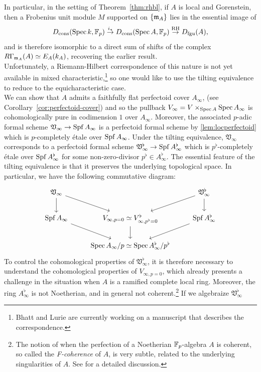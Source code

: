 In particular, in the setting of Theorem~\ref{thm:rhbl}, if $A$ is local and Gorenstein, then a Frobenius unit module $M$ supported on 
$\{\mathfrak{m}_A\}$ lies in the essential image of 
\[D_{\mathrm{cons}}(\operatorname{Spec}{k}, \mathbb{F}_p) \stackrel{i_*}{\rightarrow} D_{\mathrm{cons}}(\operatorname{Spec}{A}, \mathbb{F}_p) \stackrel{\mathrm{RH}}{\rightarrow} D_{\mathrm{fgu}}(A),\]
and is therefore isomorphic to a direct sum of shifts of the complex $R\Gamma_{\mathfrak{m}_A}(A) \simeq E_A(k_A)$, recovering the earlier result.\\
\indent Unfortunately, a Riemann-Hilbert correspondence of this nature is not yet available in mixed characteristic,\footnote{Bhatt and Lurie are currently working on a manuscript that
describes the correspondence.} so one would like to use the tilting equivalence to reduce to the equicharacteristic case.\\
\indent We can show that $A$ admits a faithfully flat perfectoid cover $A_{\infty}$, (see Corollary~\ref{cor:perfectoid-cover}) and so the pullback 
$V_{\infty} = V \times_{\operatorname{Spec}{A}} \operatorname{Spec}{A_{\infty}}$ is cohomologically pure in codimension $1$ over $A_{\infty}$.
Moreover, the associated $p$-adic formal scheme $\mathfrak{V}_{\infty} \rightarrow \operatorname{Spf}{A_{\infty}}$ is a perfectoid formal scheme by \ref{lem:locperfectoid}
which is $p$-completely \'{e}tale over $\operatorname{Spf}{A_{\infty}}$.
Under the tilting equivalence, $\mathfrak{V}_{\infty}$ corresponds to a perfectoid formal scheme $\mathfrak{V}_{\infty}^{\flat} \rightarrow \operatorname{Spf}{A_{\infty}^{\flat}}$ which is 
$p^{\flat}$-completely \'{e}tale over $\operatorname{Spf}{A_{\infty}^{\flat}}$ for some non-zero-divisor $p^{\flat} \in A_{\infty}^{\flat}$. 
The essential feature of the tilting equivalence is that it preserves the underlying topological space. In particular, we have the following commutative diagram:
\[\begin{tikzcd}\mathfrak{V}_{\infty} \arrow[d] \arrow[rd] & & \mathfrak{V}_{\infty}^{\flat} \arrow[d] \arrow[ld]\\
    \spf{A_{\infty}} \arrow[rd] & V_{\infty,p=0}\simeq V^{\flat}_{\infty, p^{\flat}=0} \arrow[d] & \spf{A_{\infty}^{\flat}} \arrow[ld]\\
    & \spec{A_{\infty}/p} \simeq \spec{A_{\infty}^{\flat}/p^{\flat}}
\end{tikzcd}\]
To control the cohomological properties of $\mathfrak{V}_{\infty}^{\flat}$, it is therefore necessary to understand
the cohomological properties of $V_{\infty,p=0}$, which already presents a challenge in the situation when $A$ is a ramified complete local ring.
Moreover, the ring $A_{\infty}^{\flat}$ is not Noetherian, and in general not coherent.\footnote{The notion of when the perfection of 
a Noetherian $\mathbb{F}_p$-algebra $A$ is coherent, so called the \textit{F-coherence} of $A$, is very subtle, related to the underlying singularities
of $A$. See \cite{fcoherence} for a detailed discussion.} If we algebraize $\mathfrak{V}_{\infty}^{\flat}$
